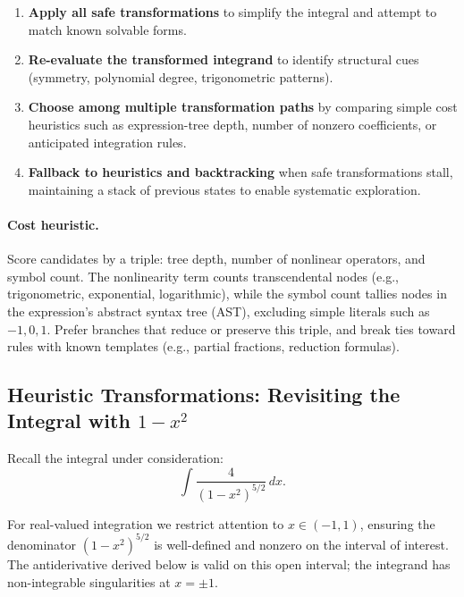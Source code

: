\begin{enumerate}
  \item \textbf{Apply all safe transformations} to simplify the integral and attempt to match known solvable forms.
  \item \textbf{Re-evaluate the transformed integrand} to identify structural cues (symmetry, polynomial degree, trigonometric patterns).
  \item \textbf{Choose among multiple transformation paths} by comparing simple cost heuristics such as expression-tree depth, number of nonzero coefficients, or anticipated integration rules.
  \item \textbf{Fallback to heuristics and backtracking} when safe transformations stall, maintaining a stack of previous states to enable systematic exploration.
\end{enumerate}

\paragraph{Cost heuristic.} Score candidates by a triple: tree depth, number of nonlinear operators, and symbol count. The nonlinearity term counts transcendental nodes (e.g., trigonometric, exponential, logarithmic), while the symbol count tallies nodes in the expression's abstract syntax tree (AST), excluding simple literals such as \(-1,0,1\). Prefer branches that reduce or preserve this triple, and break ties toward rules with known templates (e.g., partial fractions, reduction formulas).

\subsection{Heuristic Transformations: Revisiting the Integral with \texorpdfstring{\(1 - x^2\)}{1 - x squared}}
\label{sec:symbolic_heuristic_transformations_revisiting_the_integral_with_1_x_2_1_x_squared}

Recall the integral under consideration:
\begin{equation}
  \int \frac{4}{(1 - x^2)^{5/2}} \, dx.
  \label{eq:original_integral}
\end{equation}

For real-valued integration we restrict attention to \(x \in (-1,1)\), ensuring the denominator \((1 - x^2)^{5/2}\) is well-defined and nonzero on the interval of interest. The antiderivative derived below is valid on this open interval; the integrand has non-integrable singularities at \(x=\pm1\).

